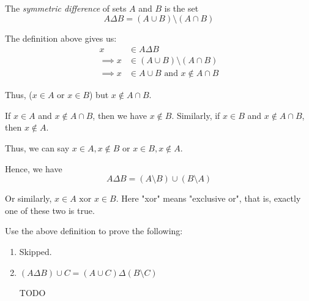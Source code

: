 \begin{definition}
	The \emph{symmetric difference} of sets $A$ and $B$ is the set 
	$$A \Delta B = (A \cup B) \setminus (A \cap B)$$
\end{definition}
\begin{scratch}
	The definition above gives us:
\begin{align*}
	x &\in A \Delta B \\
	\implies x &\in (A \cup B) \setminus (A \cap B) \\
	\implies x &\in A \cup B \text{ and } x \not\in A \cap B
\end{align*}

Thus, ($x \in A$ or $x \in B$) but $x \not\in A \cap B$.

If $x \in A$ and $x \not\in A \cap B$, then we have $x \not\in B$.
Similarly, if $x \in B$ and $x \not\in A \cap B$, then $x \not\in A$.

Thus, we can say $x \in A, x  \not\in B$ or $x \in B, x \not\in A$.

Hence, we have 
$$A \Delta B = (A \setminus B) \cup (B \setminus A)$$

Or similarly, $x \in A \text{ xor } x \in B$. Here "xor" means "exclusive or", that is, exactly one of these two is true.

\end{scratch}

\bp Use the above definition to prove the following:
\begin{enumerate}
	\item Skipped.

	\item
		$(A \Delta B) \cup C = (A \cup C) \Delta (B \setminus C)$


	\bs TODO \es

\end{enumerate}
\ep

